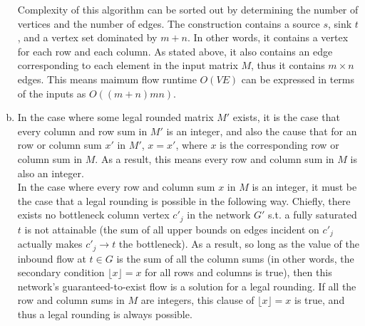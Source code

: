 \documentclass[11pt]{article}
\begin{document}
\begin{enumerate}[(a)]
\begin{solution}
    Complexity of this algorithm can be sorted out by determining the number of vertices and the number of edges. The construction contains a source $s$, sink $t$, and a vertex set dominated by $m + n$. In other words, it contains a vertex for each row and each column. As stated above, it also contains an edge corresponding to each element in the input matrix $M$, thus it contains $m \times n$ edges. This means maimum flow runtime $O(VE)$ can be expressed in terms of the inputs as $O((m + n)mn)$.
    \end{solution}
    \item
    \begin{solution}
        In the case where some legal rounded matrix $M'$ exists, it is the case that every column and row sum in $M'$ is an integer, and also the cause that for an row or column sum $x'$ in $M'$, $x = x'$, where $x$ is the corresponding row or column sum in $M$. As a result, this means every row and column sum in $M$ is also an integer. \\
        In the case where every row and column sum $x$ in $M$ is an integer, it must be the case that a legal rounding is possible in the following way. Chiefly, there exists no bottleneck column vertex ${c'}_j$ in the network $G'$ s.t. a fully saturated $t$ is not attainable (the sum of all upper bounds on edges incident on ${c'}_j$ actually makes ${c'}_j \to t$ the bottleneck). As a result, so long as the value of the inbound flow at $t \in G$ is the sum of all the column sums (in other words, the secondary condition $\lfloor x \rfloor = x$ for all rows and columns is true), then this network's guaranteed-to-exist flow is a solution for a legal rounding. If all the row and column sums in $M$ are integers, this clause of $\lfloor x \rfloor = x$ is true, and thus a legal rounding is always possible.
    \end{solution}
\end{enumerate}

\clearpage
\end{document}
